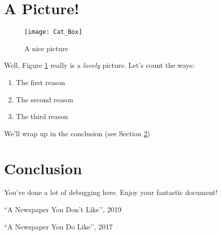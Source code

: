 \documentclass[12pt,a4paper]{article}
\begin{document}
\section{A Picture!}\label{picture_section}

\begin{figure}[h]
\centering
\texttt{[image: Cat\_Box]}
  \caption{A nice picture}\label{cats}
\end{figure}

Well, Figure \ref{cats} really is a \emph{lovely} picture. Let's count the ways:

\begin{enumerate}
\item The first reason
\item The second reason
\item The third reason
\end{enumerate}

We'll wrap up in the conclusion (see Section \ref{conclusion_section})

\section{Conclusion}\label{conclusion_section}

You've done a lot of debugging here. Enjoy your fantastic document!

\begin{thebibliography}{1}

  ``A Newspaper You Don't Like’’, 2019

  ``A Newspaper You Do Like’’, 2017

\end{thebibliography}
\end{document}
